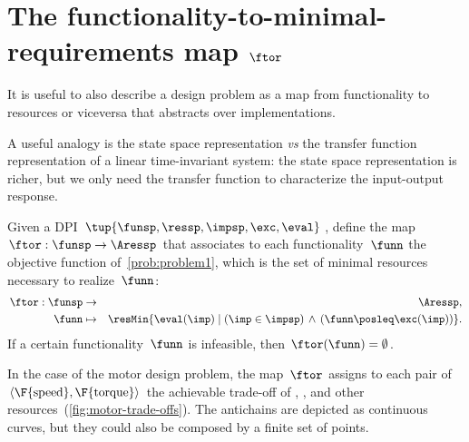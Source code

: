 

\section{The functionality-to-minimal-requirements map $\ftor$}

It is useful to also describe a design problem as a map from functionality
to resources or viceversa that abstracts over implementations.

A useful analogy is the state space representation \emph{vs} the
transfer function representation of a linear time-invariant system:
the state space representation is richer, but we only need the transfer
function to characterize the input-output response.


\begin{definition}
    \label{def:ftor}Given a DPI $\tup{ \funsp,\ressp,\impsp,\exc,\eval} $,
    define the map~$\ftor:\funsp\rightarrow\Aressp$ that associates
    to each functionality~$\funn$ the objective function of~\cref{prob:problem1},
    which is the set of minimal resources necessary to realize~$\funn$:
    \begin{eqnarray*}
        \ftor:\funsp & \rightarrow & \Aressp,\\
        \funn& \mapsto & \resMin\{\eval(\imp)\mid\left(\imp\in\impsp\right)\,\wedge\,\left(\funn\posleq\exc(\imp)\right)\}.
    \end{eqnarray*}
    If a certain functionality~$\funn$ is infeasible, then $\ftor(\funn)=\emptyset$.
\end{definition}



\begin{example}
    In the case of the motor design problem, the map~$\ftor$ assigns
    to each pair of $\left\langle \F{\text{speed}},\F{\text{torque}}\right\rangle $
    the achievable trade-off of , , and other resources~(\cref{fig:motor-trade-offs}).
    The antichains are depicted as continuous curves, but they could also
    be composed by a finite set of points.

\end{example}


